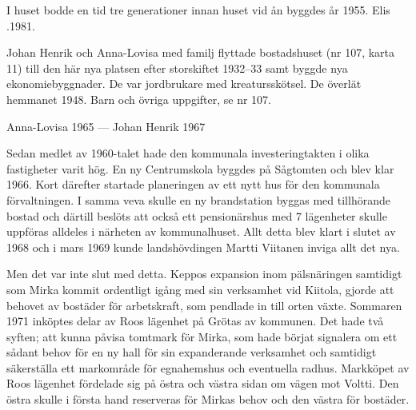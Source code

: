 I huset bodde en tid tre generationer innan huset vid ån byggdes år 1955. Elis .1981.


%
Johan Henrik och Anna-Lovisa med familj flyttade bostadshuset (nr 107, karta 11) till den här nya platsen efter storskiftet 1932--33 samt byggde nya ekonomiebyggnader. De var jordbrukare med kreatursskötsel. De överlät hemmanet 1948. Barn och övriga uppgifter, se nr 107.

Anna-Lovisa  1965  ---  Johan Henrik  1967



%



%

Sedan medlet av 1960-talet hade den kommunala investeringtakten i olika fastigheter varit hög. En ny Centrumskola byggdes på Sågtomten och blev klar 1966. Kort därefter startade planeringen av ett nytt hus för den kommunala förvaltningen. I samma veva skulle en ny brandstation byggas med tillhörande bostad och därtill beslöts att också ett pensionärshus med 7 lägenheter skulle uppföras alldeles i närheten av kommunalhuset. Allt detta blev klart i slutet av 1968 och i mars 1969 kunde landshövdingen Martti Viitanen inviga allt det nya.

Men det var inte slut med detta. Keppos expansion inom pälsnäringen samtidigt som Mirka kommit ordentligt igång med sin verksamhet vid Kiitola, gjorde att behovet av bostäder för arbetskraft, som pendlade in till orten växte. Sommaren 1971 inköptes delar av Roos lägenhet på Grötas av kommunen. Det hade två syften; att kunna påvisa tomtmark för Mirka, som hade börjat signalera om ett sådant behov för en ny hall för sin expanderande verksamhet och samtidigt säkerställa ett markområde för egnahemshus och eventuella radhus. Markköpet av Roos lägenhet fördelade sig på östra och västra sidan om vägen mot Voltti. Den östra skulle i första hand reserveras för Mirkas behov och den västra för bostäder.


